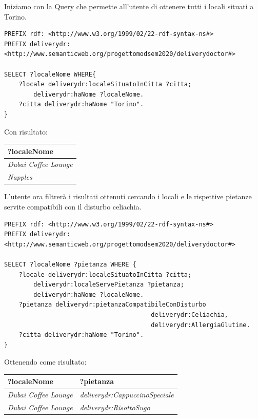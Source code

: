 \documentclass[12pt]{article}
\begin{document}
Iniziamo con la Query che permette all'utente di ottenere tutti i locali situati a Torino.
\begin{lstlisting}[language=SPARQL]
PREFIX rdf: <http://www.w3.org/1999/02/22-rdf-syntax-ns#>
PREFIX deliverydr: 
<http://www.semanticweb.org/progettomodsem2020/deliverydoctor#>
    
SELECT ?localeNome WHERE{
    ?locale deliverydr:localeSituatoInCitta ?citta;
        deliverydr:haNome ?localeNome.
    ?citta deliverydr:haNome "Torino".
}
\end{lstlisting}
Con risultato:
\newline
\newline
\begin{tabularx}{\textwidth} { 
  | >{\centering\arraybackslash}X |}
 \hline
 \textbf{?localeNome} \\
 \hline
 \textit{Dubai Coffee Lounge}\\
 \hline
 \textit{Napples}\\
\hline
\end{tabularx}
\newline
\newline
L'utente ora filtrerà i risultati ottenuti cercando i locali e le rispettive pietanze servite compatibili con il disturbo celiachia.
\begin{lstlisting}[language=SPARQL]
PREFIX rdf: <http://www.w3.org/1999/02/22-rdf-syntax-ns#>
PREFIX deliverydr:
<http://www.semanticweb.org/progettomodsem2020/deliverydoctor#>
    
SELECT ?localeNome ?pietanza WHERE {
    ?locale deliverydr:localeSituatoInCitta ?citta;
        deliverydr:localeServePietanza ?pietanza;
        deliverydr:haNome ?localeNome.
    ?pietanza deliverydr:pietanzaCompatibileConDisturbo 
                                        deliverydr:Celiachia,
                                        deliverydr:AllergiaGlutine.
    ?citta deliverydr:haNome "Torino".
}
\end{lstlisting}
Ottenendo come risultato:
\newline
\newline
\begin{tabularx}{\textwidth} { 
  | >{\centering\arraybackslash}X 
  | >{\centering\arraybackslash}X |}
 \hline
 \textbf{?localeNome} & \textbf{?pietanza} \\
 \hline
 \textit{Dubai Coffee Lounge} & \textit{deliverydr:CappuccinoSpeciale}  \\
 \hline
 \textit{Dubai Coffee Lounge} & \textit{deliverydr:RisottoSugo}\\
\hline
\end{tabularx}
\end{document}
